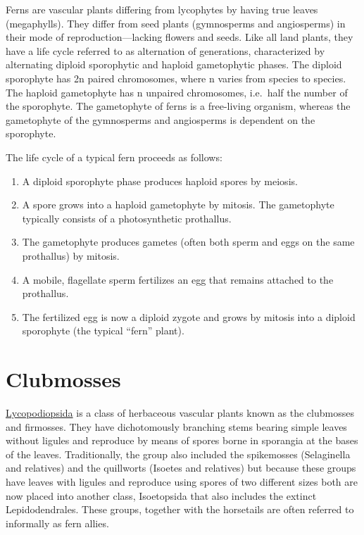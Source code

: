 Ferns are vascular plants differing from lycophytes by having true
leaves (megaphylls). They differ from seed plants (gymnosperms and
angiosperms) in their mode of reproduction---lacking flowers and seeds.
Like all land plants, they have a life cycle referred to as alternation
of generations, characterized by alternating diploid sporophytic and
haploid gametophytic phases. The diploid sporophyte has 2n paired
chromosomes, where n varies from species to species. The haploid
gametophyte has n unpaired chromosomes, i.e.~half the number of the
sporophyte. The gametophyte of ferns is a free-living organism, whereas
the gametophyte of the gymnosperms and angiosperms is dependent on the
sporophyte.

The life cycle of a typical fern proceeds as follows:

\begin{enumerate}
\def\labelenumi{\arabic{enumi}.}
\tightlist
\item
  A diploid sporophyte phase produces haploid spores by meiosis.
\item
  A spore grows into a haploid gametophyte by mitosis. The gametophyte
  typically consists of a photosynthetic prothallus.
\item
  The gametophyte produces gametes (often both sperm and eggs on the
  same prothallus) by mitosis.
\item
  A mobile, flagellate sperm fertilizes an egg that remains attached to
  the prothallus.
\item
  The fertilized egg is now a diploid zygote and grows by mitosis into a
  diploid sporophyte (the typical ``fern'' plant).
\end{enumerate}

\section{Clubmosses}\label{clubmosses}

\href{https://en.wikipedia.org/wiki/Lycopodiopsida}{Lycopodiopsida} is a
class of herbaceous vascular plants known as the clubmosses and
firmosses. They have dichotomously branching stems bearing simple leaves
without ligules and reproduce by means of spores borne in sporangia at
the bases of the leaves. Traditionally, the group also included the
spikemosses (Selaginella and relatives) and the quillworts (Isoetes and
relatives) but because these groups have leaves with ligules and
reproduce using spores of two different sizes both are now placed into
another class, Isoetopsida that also includes the extinct
Lepidodendrales. These groups, together with the horsetails are often
referred to informally as fern allies.

